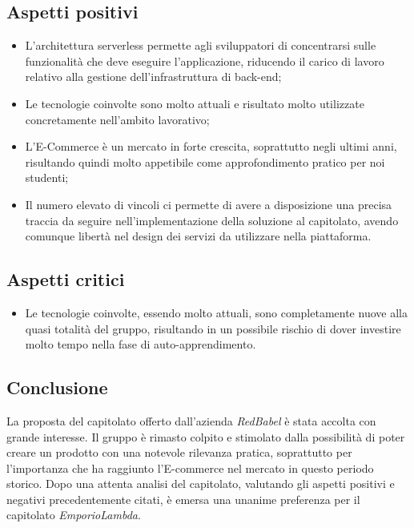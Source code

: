 \subsection{Aspetti positivi}{
\begin{itemize}
\item L'architettura serverless permette agli sviluppatori di concentrarsi sulle funzionalità che deve eseguire l'applicazione, riducendo il carico di lavoro relativo alla gestione dell'infrastruttura di back-end;
\item Le tecnologie coinvolte sono molto attuali e risultato molto utilizzate concretamente nell'ambito lavorativo;
\item L'E-Commerce è un mercato in forte crescita, soprattutto negli ultimi anni, risultando quindi molto appetibile come approfondimento pratico per noi studenti;
\item Il numero elevato di vincoli ci permette di avere a disposizione una precisa traccia da seguire nell'implementazione della soluzione al capitolato, avendo comunque libertà nel design dei servizi da utilizzare nella piattaforma.
\end{itemize}
}

\subsection{Aspetti critici}{
\begin{itemize}
\item Le tecnologie coinvolte, essendo molto attuali, sono completamente nuove alla quasi totalità del gruppo, risultando in un possibile rischio di dover investire molto tempo nella fase di auto-apprendimento.
\end{itemize}
}

\subsection{Conclusione}{
La proposta del capitolato offerto dall'azienda \textit{RedBabel} è stata accolta con grande interesse. Il gruppo è rimasto colpito e stimolato dalla possibilità di poter creare un prodotto con una notevole rilevanza pratica, soprattutto per l'importanza che ha raggiunto l'E-commerce nel mercato in questo periodo storico. Dopo una attenta analisi del capitolato, valutando gli aspetti positivi e negativi precedentemente citati, è emersa una unanime preferenza per il capitolato \textit{EmporioLambda}.
}

